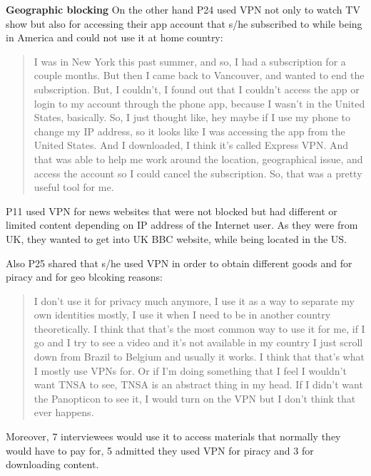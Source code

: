 \textbf{Geographic blocking} On the other hand P24 used VPN not only to watch
TV show but also for accessing their app account that s/he subscribed to while
being in America and could not use it at home country: \begin{quote}I was in
New York this past summer, and so, I had a subscription for a couple months.
But then I came back to Vancouver, and wanted to end the subscription. But, I
couldn't, I found out that I couldn't access the app or login to my account
through the phone app, because I wasn't in the United States, basically. So, I
just thought like, hey maybe if I use my phone to change my IP address, so it
looks like I was accessing the app from the United States. And I downloaded, I
think it's called Express VPN. And that was able to help me work around the
location, geographical issue, and access the account so I could cancel the
subscription. So, that was a pretty useful tool for me.\end{quote}


P11 used VPN for news websites that were not blocked but had different or
limited content depending on IP address of the Internet user. As they were
from UK, they wanted to get into UK BBC website, while being located in the
US.

Also P25 shared that s/he used VPN in order to obtain different goods and for
piracy and for geo blcoking reasons: \begin{quote}I don't use it for privacy
much anymore, I use it as a way to separate my own identities mostly, I use it
when I need to be in another country theoretically. I think that that's the
most common way to use it for me, if I go and I try to see a video and it's
not available in my country I just scroll down from Brazil to Belgium and
usually it works. I think that that's what I mostly use VPNs for. Or if I'm
doing something that I feel I wouldn't want TNSA to see, TNSA is an abstract
thing in my head. If I didn't want the Panopticon to see it, I would turn on
the VPN but I don't think that ever happens.\end{quote}

Moreover, 7 interviewees would use it to access materials that normally they
would have to pay for, 5 admitted they used VPN for piracy and 3 for
downloading content.

